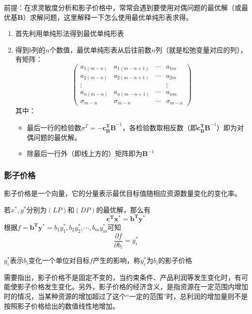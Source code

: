 \documentclass{book}
\begin{document}
前提：在求灵敏度分析和影子价格中，常常会遇到要使用对偶问题的最优解（或最优基$\boldsymbol{B}$）求解问题，这里解释一下怎么使用最优单纯形表求得。

\begin{enumerate}
    \item 首先利用单纯形法得到最优单纯形表
    \item 得到$b$列的$n$个数值，最优单纯形表从后往前数$n$列（就是松弛变量对应的列），有矩阵：$$\begin{pmatrix}
                  a_{1(m-n)}   & a_{1(m-n+1)} & \cdots & a_{1m}       \\
                  a_{2(m-n)}   & a_{2(m-n+1)} & \cdots & a_{2m}       \\
                  \vdots       &              &        & \vdots       \\
                  a_{n(m-n)}   & a_{n(m-n+1)} & \cdots & a_{nm}       \\
                  \hline
                  \sigma_{m-n} & \sigma_{m-n} & \cdots & \sigma_{m-n}
              \end{pmatrix}$$
          其中：
          \begin{itemize}
              \item 最后一行的检验数$\sigma^T =- \boldsymbol{c_B^TB}^{-1}$，各检验数取相反数（即$\boldsymbol{c_B^TB}^{-1}$）即为对偶问题的最优解。
              \item 除最后一行外（即线上方的）矩阵即为$\boldsymbol{B}^{-1}$
          \end{itemize}
\end{enumerate}

\subsubsection{影子价格}

影子价格是一个向量，它的分量表示最优目标值随相应资源数量变化的变化率。

若$x^*, y^*$分别为$(LP)$和$(DP)$的最优解，那么有$$\boldsymbol{c^Tx^*}=\boldsymbol{b^Ty^*}$$根据$f=\boldsymbol{b^Ty^*}=b_1y^*_1, b_2y^*_2, \cdots, b_my^*_m$可知$$\frac{\partial f}{\partial b_i} = y_i^*$$

$y_i^*$表示$b_i$变化一个单位对目标$f$产生的影响，称$y_i^*$为$b_i$的影子价格

需要指出，影子价格不是固定不变的，当约束条件、产品利润等发生变化时，有可能使影子价格发生变化。另外，影子价格的经济含义，是指资源在一定范围内增加时的情况，当某种资源的增加超过了这个“一定的范围”时，总利润的增加量则不是按照影子价格给出的数值线性地增加。
\end{document}
